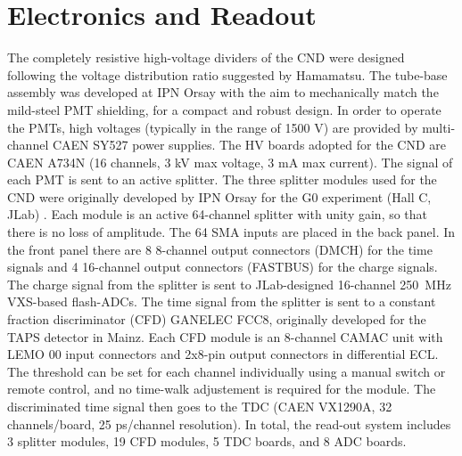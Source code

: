 \section{Electronics and Readout}
The completely resistive high-voltage dividers of the CND were designed following the voltage distribution ratio suggested by Hamamatsu. The tube-base assembly was developed at IPN Orsay with the aim to mechanically match the mild-steel PMT shielding, for a compact and robust design. 
In order to operate the PMTs, high voltages (typically in the range of 1500 V) are provided by multi-channel CAEN SY527 power supplies. 
The HV boards adopted for the CND are CAEN A734N (16 channels, 3 kV max voltage, 3 mA max current). %
The signal of each PMT is sent to an active splitter.
The three splitter modules used for the CND were originally developed by IPN Orsay for the G0 experiment (Hall C, JLab) \cite{Androic:2011rha}. Each module is an active 64-channel splitter with unity gain, so that there is no loss of amplitude. The 64 SMA inputs are placed in the back panel. In the front panel there are 8 8-channel output connectors (DMCH) for the time signals and 4 16-channel output connectors (FASTBUS) for the charge signals. 
The charge signal from the splitter is sent to JLab-designed 16-channel 250~MHz VXS-based flash-ADCs.  
The time signal from the splitter is sent to a constant fraction discriminator (CFD) GANELEC FCC8, originally developed for the TAPS detector in Mainz. Each CFD module is an 8-channel CAMAC unit with LEMO 00 input connectors and 2x8-pin output connectors in differential ECL. The threshold can be set for each channel individually using a manual switch or remote control, and no time-walk adjustement is required for the module.  
The discriminated time signal then goes to the TDC (CAEN VX1290A, 32 channels/board, 25 ps/channel resolution). 
In total, the read-out system includes 3 splitter modules, 19 CFD modules, 5 TDC boards, and 8 ADC boards. 



